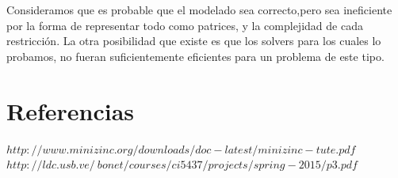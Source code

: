 \documentclass{article}
\begin{document}
Consideramos que es probable que el modelado sea correcto,pero sea ineficiente por la forma de representar todo como patrices, y la complejidad de cada restricción. La otra posibilidad que existe es que los solvers para los cuales lo probamos, no fueran suficientemente eficientes para un problema de este tipo. \par


\clearpage

\section{Referencias}


$http://www.minizinc.org/downloads/doc-latest/minizinc-tute.pdf$
$http://ldc.usb.ve/~bonet/courses/ci5437/projects/spring-2015/p3.pdf$
\end{document}
